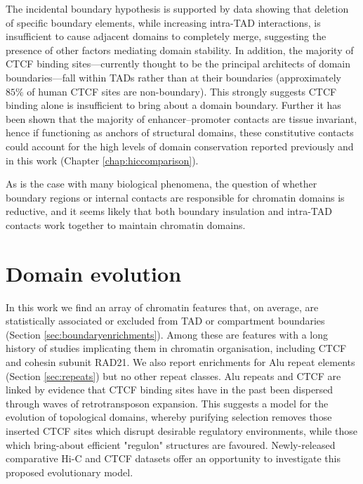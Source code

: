 \documentclass[a4paper,11pt,oneside]{book}
\begin{document}
The incidental boundary hypothesis is supported by data showing that deletion of specific boundary elements, while increasing intra-TAD interactions, is insufficient to cause adjacent domains to completely merge,\cite{Nora2012} suggesting the presence of other factors mediating domain stability. In addition, the majority of CTCF binding sites---currently thought to be the principal architects of domain boundaries---fall within TADs rather than at their boundaries (approximately $85\%$ of human CTCF sites are non-boundary\cite{Dixon2012}). This strongly suggests CTCF binding alone is insufficient to bring about a domain boundary. Further it has been shown that the majority of enhancer--promoter contacts are tissue invariant,\cite{Bouwman2015a} hence if functioning as anchors of structural domains, these constitutive contacts could account for the high levels of domain conservation reported previously\cite{Lieberman2009, Dixon2012, Chambers2013, Rao2014} and in this work (Chapter \ref{chap:hiccomparison}).

As is the case with many biological phenomena, the question of whether boundary regions or internal contacts are responsible for chromatin domains is reductive, and it seems likely that both boundary insulation and intra-TAD contacts work together to maintain chromatin domains.

\section{Domain evolution}

In this work we find an array of chromatin features that, on average, are statistically associated or excluded from TAD or compartment boundaries (Section \ref{sec:boundaryenrichments}). Among these are features with a long history of studies implicating them in chromatin organisation, including CTCF and cohesin subunit RAD21. We also report enrichments for Alu repeat elements (Section \ref{sec:repeats}) but no other repeat classes. Alu repeats and CTCF are linked by evidence that CTCF binding sites have in the past been dispersed through waves of retrotransposon expansion.\cite{Schmidt2012, Nikolaev2009} This suggests a model for the evolution of topological domains, whereby purifying selection removes those inserted CTCF sites which disrupt desirable regulatory environments, while those which bring-about efficient "regulon" structures are favoured. Newly-released comparative Hi-C and CTCF datasets\cite{VietriRudan2015} offer an opportunity to investigate this proposed evolutionary model. 
\end{document}
